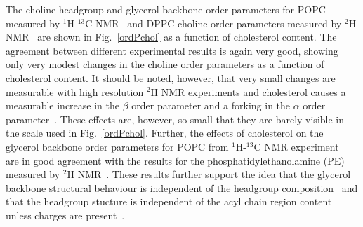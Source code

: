 \documentclass[journal=jacsat,manuscript=article]{achemso}
\begin{document}
The choline headgroup and glycerol backbone order parameters for POPC measured by $^1$H-$^{13}$C NMR~\cite{ferreira13} and DPPC choline order parameters 
measured by $^{2}$H NMR~\cite{brown78} are shown in Fig.~\ref{ordPchol} as a function of cholesterol content.
The agreement between different experimental results is again very good, showing only very modest changes in 
the choline order parameters as a function of cholesterol content. It should be noted, however, that very small
changes are measurable with high resolution $^{2}$H NMR experiments
and cholesterol causes a measurable increase in the $\beta$ order parameter and a forking in the $\alpha$ order
parameter~\cite{brown78}. These effects are, however, so small that they are barely visible in the scale used in Fig.~\ref{ordPchol}.
Further, the effects of cholesterol on the glycerol backbone order parameters for POPC from $^1$H-$^{13}$C NMR experiment~\cite{ferreira13} 
are in good agreement with the results for the phosphatidylethanolamine (PE) measured by $^{2}$H NMR~\cite{ghosh82}.
These results further support the idea that the glycerol backbone structural behaviour is independent of the
headgroup composition~\cite{gally81} and that the headgroup stucture is independent of the acyl chain region content unless
charges are present~\cite{scherer87}.
\end{document}
